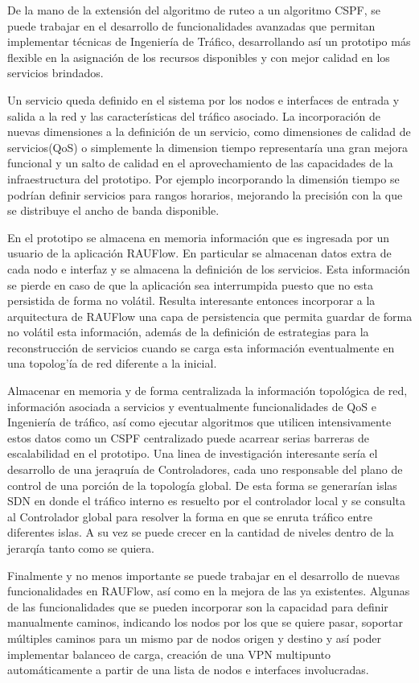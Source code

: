 De la mano de la extensi\'on del algoritmo de ruteo a un algoritmo CSPF, se puede trabajar en el desarrollo de funcionalidades avanzadas que permitan implementar t\'ecnicas de Ingenier\'ia de Tr\'afico, desarrollando as\'i un prototipo m\'as flexible en la asignaci\'on de los recursos disponibles y con mejor calidad en los servicios brindados.

Un servicio queda definido en el sistema por los nodos e interfaces de entrada y salida a la red y las caracter\'isticas del tr\'afico asociado. La incorporaci\'on de nuevas dimensiones a la definici\'on de un servicio, como dimensiones de calidad de servicios(QoS) o simplemente la dimension tiempo representar\'ia una gran mejora funcional y un salto de calidad en el aprovechamiento de las capacidades de la infraestructura del prototipo. Por ejemplo incorporando la dimensi\'on tiempo se podr\'ian definir servicios para rangos horarios, mejorando la precisi\'on con la que se distribuye el ancho de banda disponible.

En el prototipo se almacena en memoria informaci\'on que es ingresada por un usuario de la aplicaci\'on RAUFlow. En particular se almacenan datos extra de cada nodo e interfaz y se almacena la definici\'on de los servicios. Esta informaci\'on se pierde en caso de que la aplicaci\'on sea interrumpida puesto que no esta persistida de forma no volátil. Resulta interesante entonces incorporar a la arquitectura de RAUFlow una capa de persistencia que permita guardar de forma no vol\'atil esta informaci\'on, adem\'as de la definici\'on de estrategias para la reconstrucci\'on de servicios cuando se carga esta informaci\'on eventualmente en una topolog'\'ia de red diferente a la inicial.

Almacenar en memoria y de forma centralizada la informaci\'on topol\'ogica de red, informaci\'on asociada a servicios y eventualmente funcionalidades de QoS e Ingenier\'ia de tr\'afico, as\'i como ejecutar algoritmos que utilicen intensivamente estos datos como un CSPF centralizado puede acarrear serias barreras de escalabilidad en el prototipo. Una linea de investigaci\'on interesante ser\'ia el desarrollo de una jeraqru\'ia de Controladores, cada uno responsable del plano de control de una porci\'on de la topolog\'ia global. De esta forma se generar\'ian islas SDN en donde el tr\'afico interno es resuelto por el controlador local y se consulta al Controlador global para resolver la forma en que se enruta tr\'afico entre diferentes islas. A su vez se puede crecer en la cantidad de niveles dentro de la jerarq\'ia tanto como se quiera.

Finalmente y no menos importante se puede trabajar en el desarrollo de nuevas funcionalidades en RAUFlow, así como en la mejora de las ya existentes. Algunas de las funcionalidades que se pueden incorporar son la capacidad para definir manualmente caminos, indicando los nodos por los que se quiere  
pasar, soportar m\'ultiples caminos para un mismo par de nodos origen y destino y as\'i poder implementar balanceo de carga, creaci\'on de una VPN multipunto autom\'aticamente a partir de una lista de nodos e interfaces involucradas. 



